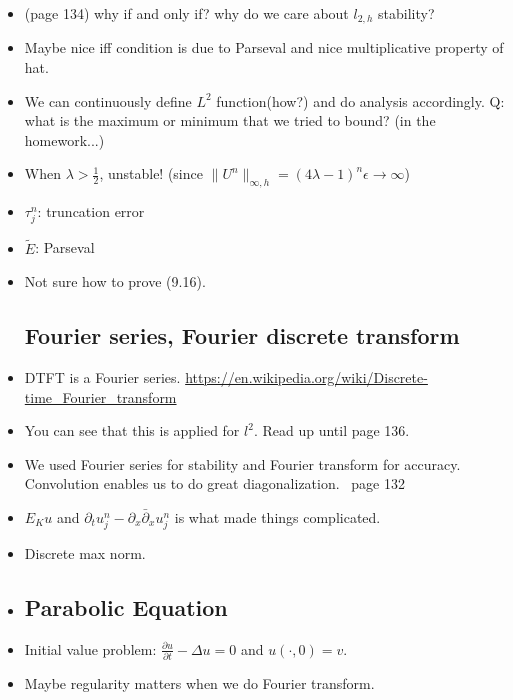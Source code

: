 \documentclass{article}
\theoremstyle{remark}
\begin{document}
\begin{itemize}
\item (page 134) why if and only if? why do we care about $l_{2,h}$ stability?
\item Maybe nice iff condition is due to Parseval and nice multiplicative property of hat.
\item We can continuously define $L^2$ function(how?) and do analysis accordingly.
Q: what is the maximum or minimum that we tried to bound? (in the homework...)
\item When $\lambda>\frac 12$, unstable! (since $\lVert U^n\rVert_{\infty,h}=(4\lambda-1)^n\epsilon\to\infty$)
\item $\tau^n_j$: truncation error

\item $\tilde E$: Parseval
\item Not sure how to prove (9.16).













\subsection*{Fourier series, Fourier discrete transform}
\item DTFT is a Fourier series. \url{https://en.wikipedia.org/wiki/Discrete-time_Fourier_transform}
\item You can see that this is applied for $l^2$. Read up until page 136.
\item We used Fourier series for stability and Fourier transform for accuracy. Convolution enables us to do great diagonalization. ~page 132
\item $E_K u$ and $\partial_t u_j^n-\partial_x\bar\partial_x u^n_j$ is what made things complicated. 
\item Discrete max norm.
\item 













\subsection*{Parabolic Equation}
\item Initial value problem: $\frac{\partial u}{\partial t}-\Delta u=0$ and $u(\cdot, 0)=v$.
\item Maybe regularity matters when we do Fourier transform. 








\end{itemize}
\end{document}
